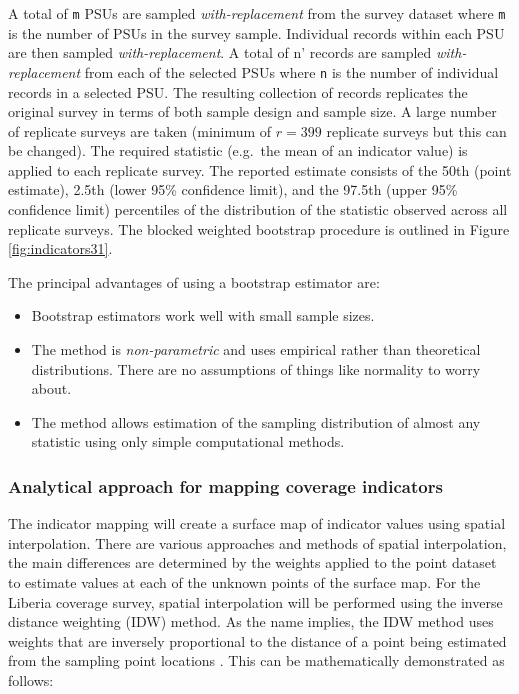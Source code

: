 \documentclass[12pt,a4paper]{article}
\begin{document}
A total of \texttt{m} PSUs are sampled \emph{with-replacement} from the survey dataset where \texttt{m} is the number of PSUs in the survey sample. Individual records within each PSU are then sampled \emph{with-replacement}. A total of n' records are sampled \emph{with-replacement} from each of the selected PSUs where \texttt{n} is the number of individual records in a selected PSU. The resulting collection of records replicates the original survey in terms of both sample design and sample size. A large number of replicate surveys are taken (minimum of \(r = 399\) replicate surveys but this can be changed). The required statistic (e.g.~the mean of an indicator value) is applied to each replicate survey. The reported estimate consists of the 50th (point estimate), 2.5th (lower 95\% confidence limit), and the 97.5th (upper 95\% confidence limit) percentiles of the distribution of the statistic observed across all replicate surveys. The blocked weighted bootstrap procedure is outlined in Figure \ref{fig:indicators31}.

The principal advantages of using a bootstrap estimator are:

\begin{itemize}
\item
  Bootstrap estimators work well with small sample sizes.
\item
  The method is \emph{non-parametric} and uses empirical rather than theoretical distributions. There are no assumptions of things like normality to worry about.
\item
  The method allows estimation of the sampling distribution of almost any statistic using only simple computational methods.
\end{itemize}

\hypertarget{analytical-approach-for-mapping-coverage-indicators}{%
\subsubsection{Analytical approach for mapping coverage indicators}\label{analytical-approach-for-mapping-coverage-indicators}}

The indicator mapping will create a surface map of indicator values using spatial interpolation. There are various approaches and methods of spatial interpolation, the main differences are determined by the weights applied to the point dataset to estimate values at each of the unknown points of the surface map. For the Liberia coverage survey, spatial interpolation will be performed using the inverse distance weighting (IDW) method. As the name implies, the IDW method uses weights that are inversely proportional to the distance of a point being estimated from the sampling point locations \citep{isaaks1989applied, diggle2007mbg, diggle2013statistical}. This can be mathematically demonstrated as follows:
\end{document}
